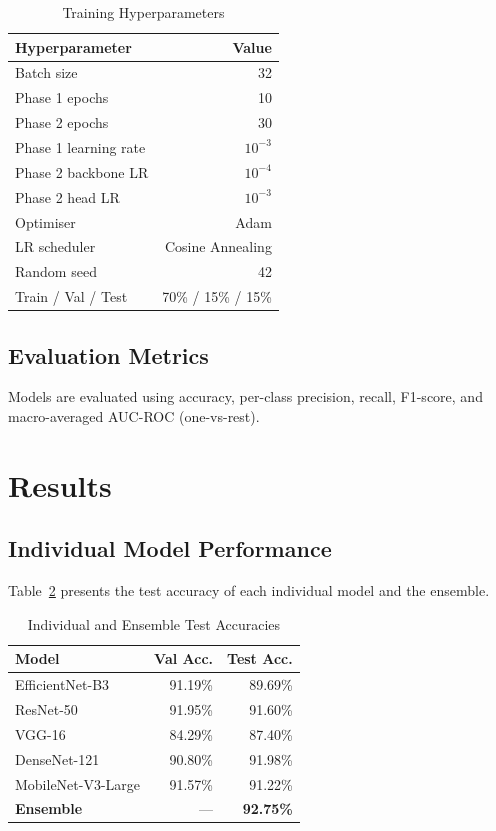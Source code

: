 \documentclass[conference]{IEEEtran}
\begin{document}
\begin{table}[htbp]
\caption{Training Hyperparameters}
\label{tab:hyperparams}
\centering
\begin{tabular}{lr}
\toprule
\textbf{Hyperparameter} & \textbf{Value} \\
\midrule
Batch size              & 32 \\
Phase 1 epochs          & 10 \\
Phase 2 epochs          & 30 \\
Phase 1 learning rate   & $10^{-3}$ \\
Phase 2 backbone LR     & $10^{-4}$ \\
Phase 2 head LR         & $10^{-3}$ \\
Optimiser               & Adam \\
LR scheduler            & Cosine Annealing \\
Random seed             & 42 \\
Train / Val / Test      & 70\% / 15\% / 15\% \\
\bottomrule
\end{tabular}
\end{table}

\subsection{Evaluation Metrics}

Models are evaluated using accuracy, per-class precision, recall, F1-score, and macro-averaged AUC-ROC (one-vs-rest).

\section{Results}

\subsection{Individual Model Performance}

Table~\ref{tab:results} presents the test accuracy of each individual model and the ensemble.

\begin{table}[htbp]
\caption{Individual and Ensemble Test Accuracies}
\label{tab:results}
\centering
\begin{tabular}{lrr}
\toprule
\textbf{Model} & \textbf{Val Acc.} & \textbf{Test Acc.} \\
\midrule
EfficientNet-B3     & 91.19\% & 89.69\% \\
ResNet-50           & 91.95\% & 91.60\% \\
VGG-16              & 84.29\% & 87.40\% \\
DenseNet-121        & 90.80\% & 91.98\% \\
MobileNet-V3-Large  & 91.57\% & 91.22\% \\
\midrule
\textbf{Ensemble}   & ---     & \textbf{92.75\%} \\
\bottomrule
\end{tabular}
\end{table}
\end{document}
